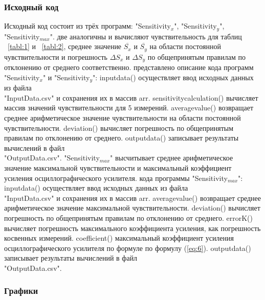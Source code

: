 \subsubsection{Исходный код}
Исходный код состоит из трёх программ: "Sensitivity$_x$", "Sensitivity$_y$", \\"Sensitivity$_{max}$".  две аналогичны и вычисляют чувствительность для таблиц ~\ref{tabl:1} и ~\ref{tabl:2}, среднее значение $\overline{S_x}$ и $\overline{S_y}$ на области постоянной чувствительности и погрешность $\Delta S_x$ и $\Delta S_y$ по общепринятым правилам по отклонению от среднего соответственно.
\vspace{3mm}
 представлено описание кода программ "Sensitivity$_x$" и "Sensitivity$_y$":
 inputdata() осуществляет ввод исходных данных из файла \\"InputData.csv"
и сохранения их в массив arr.
 sensitivity\underline{}calculation() вычисляет массив значений чувствительности для 5 измерений.
 average\underline{}value() возвращает среднее арифметическое значение чувствительности на области постоянной чувствительности.
 deviation() вычисляет погрешность по общепринятым правилам по отклонению от среднего.
 outputdata() записывает результаты вычислений в файл \\"OutputData.csv".
\vspace{3mm}
 "Sensitivity$_{max}$" высчитывает среднее арифметическое значение максимальной чувствительности и максимальный коэффициент усиления осциллографического усилителя.
 кода программы "Sensitivity$_{max}$":
 inputdata() осуществляет ввод исходных данных из файла \\"InputData.csv"
и сохранения их в массив arr.
 average\underline{}value() возвращает среднее арифметическое значение максимальной чувствительности.
 deviation() вычисляет погрешность по общепринятым правилам по отклонению от среднего.
 errorK() вычисляет погрешность максимального коэффициента усиления, как погрешность косвенных измерений.
 coefficient() максимальный коэффициент усиления осциллографического усилителя по формуле по формулу (\ref{eq:6}).
 outputdata() записывает результаты вычислений в файл \\"OutputData.csv".
\vspace{3mm}


\subsubsection{Графики}




